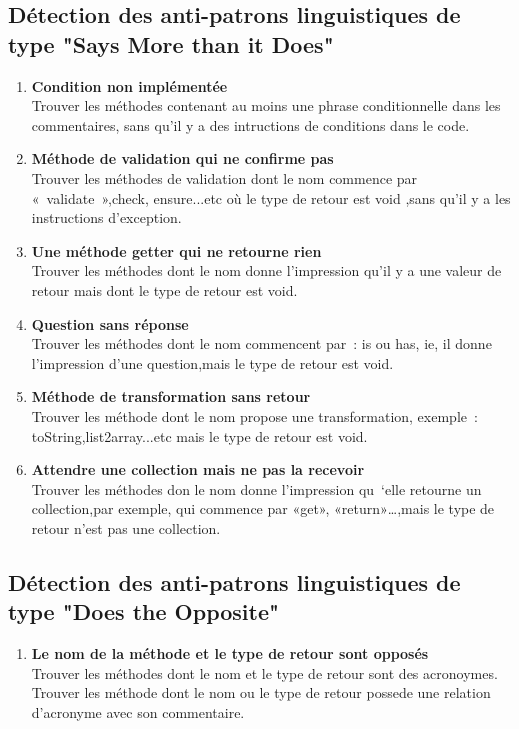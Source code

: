 \subsection{Détection des anti-patrons linguistiques de type "Says More than it Does"}
\begin{enumerate}
\item \textbf{Condition non implémentée}\\
Trouver les méthodes contenant au moins une phrase conditionnelle dans les commentaires, sans qu’il y a des intructions de conditions dans le code.
\item \textbf{Méthode de validation qui ne confirme pas}\\
Trouver les méthodes de validation dont le nom commence par « validate »,check, ensure...etc où le type de retour est void ,sans qu’il y a les instructions d’exception.
\item \textbf{Une méthode getter qui ne retourne rien}\\
Trouver les méthodes dont le nom donne l’impression qu’il y a une valeur de retour mais dont le type de retour est void.
\item \textbf {Question sans réponse}\\
Trouver les méthodes dont le nom commencent par : is ou has, ie, il donne l’impression d’une question,mais le type de retour est void.
\item \textbf{Méthode de transformation sans retour}\\
Trouver les méthode dont le nom propose une transformation, exemple : toString,list2array...etc mais le type de retour est void.
\item \textbf{Attendre une collection mais ne pas la recevoir}\\
Trouver les méthodes don le nom  donne l’impression qu ‘elle retourne un collection,par exemple, qui commence par «get», «return»…,mais le type de retour n’est pas une collection.
\end{enumerate}

\subsection{Détection des anti-patrons linguistiques de type "Does the Opposite"}
\begin{enumerate}
\item \textbf{Le nom de la méthode et le type de retour sont opposés}\\
Trouver les méthodes dont le nom et le type de retour sont des acronoymes.
 \\
Trouver les méthode dont le nom ou le type de retour possede une relation d’acronyme avec son commentaire.
\end{enumerate}
